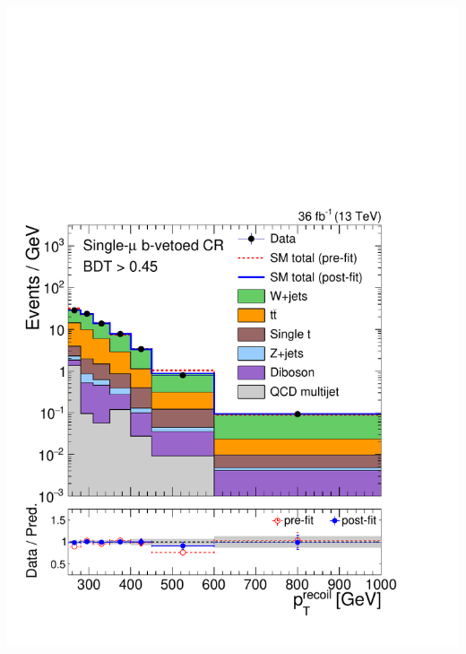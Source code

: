 \documentclass[aspectratio=169,xcolor=dvipsnames,,table,compress]{beamer}
\begin{document}
\begin{frame}[t]
\begin{columns}[T]
\begin{column}{0.125\textwidth}
      \includegraphics[width=\textwidth]{../figures/monotop/postfit/stackedPostfit_singlemuonw_monotop.pdf}\\ 

\end{column}
\end{columns}
\end{frame}
\end{document}
